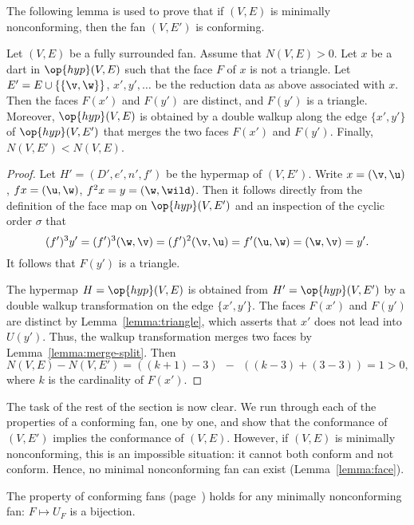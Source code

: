 The following lemma is used to prove that if $(V,E)$ is minimally nonconforming,
then the fan $(V,E')$ is conforming.

\begin{lemma}[]\cutrate{}\label{lemma:lessN}
  Let $(V,E)$ be a fully surrounded fan.  Assume that $N(V,E)>0$.  Let
  $x$ be a dart in $\op{hyp}(V,E)$ such that the face $F$ of $x$ is
  not a triangle.  Let $E'=E\cup \{\{\v,\w\}\}$, $x',y',\ldots$ be the reduction data
  as above associated with $x$.  Then the faces $F(x')$ and $F(y')$ are distinct, and
  $F(y')$ is a
  triangle. Moreover, $\op{hyp}(V,E)$ is obtained by a double walkup along the
  edge $\{x',y'\}$ of $\op{hyp}(V,E')$ that merges the two faces $F(x')$ and $F(y')$.
  Finally, $N(V,E')<N(V,E)$.
\end{lemma}


\begin{proof} Let $H'=(D',e',n',f')$ be the hypermap of $(V,E')$.
Write $x = (\v,\u)$, $f x = (\u,\w)$, $f^2 x = y = (\w,\wild )$.
Then it follows directly from the definition of the face map on $\op{hyp}(V,E')$
and an inspection of the cyclic order $\sigma$ that
\[ 
(f')^3 y' = (f')^3 (\w,\v) = (f')^2(\v,\u) = f' (\u,\w) = (\w,\v) = y'.
\] 
It follows that $F(y')$ is a triangle.

The hypermap $H=\op{hyp}(V,E)$ is obtained from $H'=\op{hyp}(V,E')$ by
a double walkup transformation on the edge $\{x',y'\}$.  The faces
$F(x')$ and $F(y')$ are distinct by Lemma~\ref{lemma:triangle}, which
asserts that $x'$ does not lead into $U(y')$.  Thus, the walkup
transformation merges two faces by Lemma~\ref{lemma:merge-split}.
Then
\[ N(V,E) - N(V,E') = ((k+1)-3) ~~-~~ ((k-3) +
(3-3)) = 1 >0,\]  where $k$ is the cardinality of
$F(x')$.
\end{proof}

The task of the rest of the section is now clear.  We run through each
of the properties of a conforming fan, one by one, and show that the
conformance of $(V,E')$ implies the conformance of $(V,E)$.  However,
if $(V,E)$ is minimally nonconforming, this is an impossible
situation: it cannot both conform and not conform.  Hence, no minimal
nonconforming fan can exist (Lemma~\ref{lemma:face}).

\begin{lemma}[bijection]\cutrate{}
The property  of conforming fans (page~\pageref{def:conforming}) 
holds for any
minimally nonconforming fan: $F\mapsto U_F$ is a bijection.
\end{lemma}

